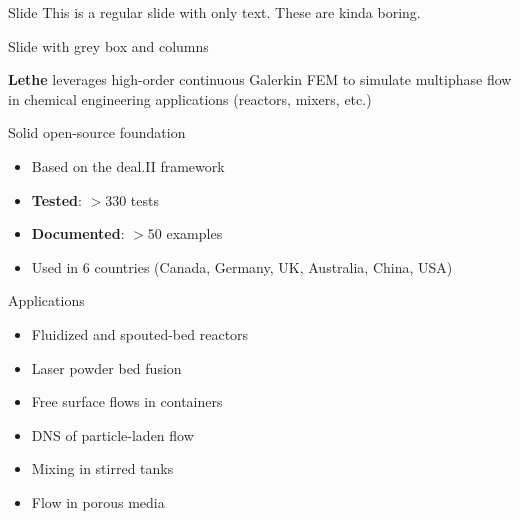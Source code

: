 \begin{frame}{Slide}
    This is a regular slide with only text.             These are kinda boring.
\end{frame}




\begin{frame}{Slide with grey box and columns}
	\visible<1->
	{\begin{shaded}
			\textbf{Lethe} leverages high-order continuous Galerkin FEM to simulate multiphase flow in chemical engineering applications (reactors, mixers, etc.)
	\end{shaded}}
	
	\begin{minipage}[t]{0.48\linewidth}
		{
			\begin{block}{Solid open-source foundation}
				\begin{itemize}
					\item Based on the deal.II framework
					\item \textbf{Tested}: $>330$ tests
					\item \textbf{Documented}: $>50$ examples
					\item Used in 6 countries (Canada, Germany, UK, Australia, China, USA)
				\end{itemize}
			\end{block}
		}
	\end{minipage}%
	\hfill%
	\begin{minipage}[t]{0.48\linewidth}
		{
			\begin{block}{Applications}
				\begin{itemize}
					\item Fluidized and spouted-bed reactors
					\item Laser powder bed fusion
					\item Free surface flows in containers
					\item DNS of particle-laden flow
					\item Mixing in stirred tanks 
					\item Flow in porous media
				\end{itemize}
			\end{block}
		}
	\end{minipage}
\end{frame}



